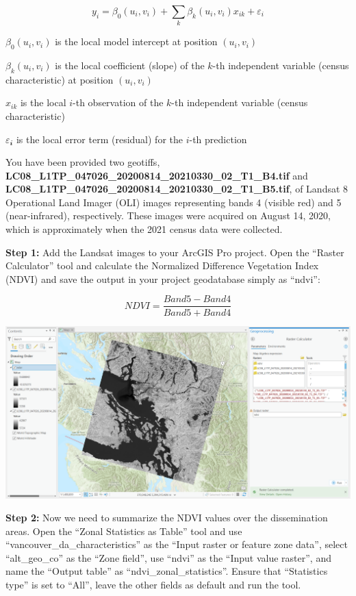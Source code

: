 \documentclass[
]{book}
\begin{document}
\[
y_i=𝛽_0(u_i,v_i)+\sum_{k}^{}𝛽_𝑘(u_i,v_i) 𝑥_{𝑖𝑘}+ε _𝑖
\]

\(𝛽_0(u_i,v_i)\) is the local model intercept at position \((u_i,v_i)\)

\(𝛽_k(u_i,v_i)\) is the local coefficient (slope) of the \(k\)-th independent variable (census characteristic) at position \((u_i,v_i)\)

\(𝑥_{𝑖𝑘}\) is the local \(i\)-th observation of the \(k\)-th independent variable (census characteristic)

\(ε _𝒊\) is the local error term (residual) for the \(i\)-th prediction

You have been provided two geotiffs, \textbf{LC08\_L1TP\_047026\_20200814\_20210330\_02\_T1\_B4.tif} and \textbf{LC08\_L1TP\_047026\_20200814\_20210330\_02\_T1\_B5.tif}, of Landsat 8 Operational Land Imager (OLI) images representing bands 4 (visible red) and 5 (near-infrared), respectively. These images were acquired on August 14, 2020, which is approximately when the 2021 census data were collected.

\textbf{Step 1:} Add the Landsat images to your ArcGIS Pro project. Open the ``Raster Calculator'' tool and calculate the Normalized Difference Vegetation Index (NDVI) and save the output in your project geodatabase simply as ``ndvi'':

\[
NDVI=\frac{Band5-Band4}{Band5+Band4}
\]

\includegraphics[width=1\linewidth]{images/06-arcgis-ndvi}

\textbf{Step 2:} Now we need to summarize the NDVI values over the dissemination areas. Open the ``Zonal Statistics as Table'' tool and use ``vancouver\_da\_characteristics'' as the ``Input raster or feature zone data'', select ``alt\_geo\_co'' as the ``Zone field'', use ``ndvi'' as the ``Input value raster'', and name the ``Output table'' as ``ndvi\_zonal\_statistics''. Ensure that ``Statistics type'' is set to ``All'', leave the other fields as default and run the tool.
\end{document}

